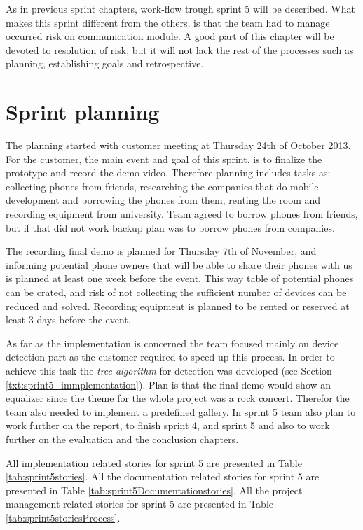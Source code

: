 \label{chap:sprint5}
As in previous sprint chapters, work-flow trough sprint 5 will be described. What makes this sprint different from the others, is that the team had to manage occurred risk on communication module. A good part of this chapter will be devoted to resolution of risk, but it will not lack the rest of the processes such as planning, establishing goals and retrospective.

\section{Sprint planning}

The planning started with customer meeting at Thursday 24th of October 2013. For the customer, the main event and goal of this sprint, is to finalize the prototype and record the demo video. Therefore planning includes tasks as: collecting phones from friends, researching the companies that do mobile development and borrowing the phones from them, renting the room and recording equipment from university. Team agreed to borrow phones from friends, but if that did not work backup plan was to borrow phones from companies.

The recording final demo is planned for Thursday 7th of November, and informing potential phone owners that will be able to share their phones with us is planned at least one week before the event. This way table of potential phones can be crated, and risk of not collecting the sufficient number of devices can be reduced and solved. Recording equipment is planned to be rented or reserved at least 3 days before the event.

As far as the implementation is concerned the team focused mainly on device detection part as the customer required to speed up this process. In order to achieve this task the \textit{tree algorithm} for detection was developed (see Section \ref{txt:sprint5_immplementation}). Plan is that the final demo would show an equalizer since the theme for the whole project was a rock concert. Therefor the team also needed to implement a predefined gallery.
In sprint 5 team also plan to work further on the report, to finish sprint 4, and sprint 5 and also to work further on the evaluation and the conclusion chapters.  

All implementation related stories for sprint 5 are presented in Table \ref{tab:sprint5stories}.
 All the documentation related stories for sprint 5 are presented in Table \ref{tab:sprint5Documentationstories}.
 All the project management related stories for sprint 5 are presented in Table \ref{tab:sprint5storiesProcess}.


